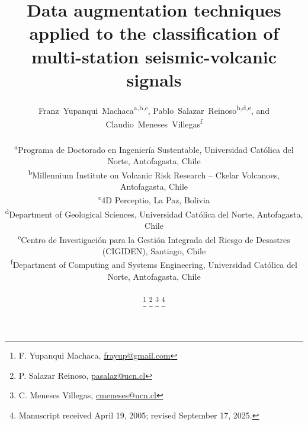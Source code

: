 \documentclass[journal]{IEEEtran}
\begin{document}
%
\title{Data augmentation techniques applied to the classification of multi-station seismic-volcanic signals}
%
%
%

\author{Franz~Yupanqui~Machaca\textsuperscript{a,b,c}, Pablo~Salazar~Reinoso\textsuperscript{b,d,e}, and
  Claudio~Meneses~Villegas\textsuperscript{f}\\
  \vspace{1mm}
  \begin{flushleft}
  \small\textsuperscript{a}Programa de Doctorado en Ingeniería Sustentable, Universidad Católica del Norte, Antofagasta, Chile\\
  \textsuperscript{b}Millennium Institute on Volcanic Risk Research – Ckelar Volcanoes, Antofagasta, Chile\\
  \textsuperscript{c}4D Perceptio, La Paz, Bolivia\\
  \textsuperscript{d}Department of Geological Sciences, Universidad Católica del Norte, Antofagasta, Chile\\
  \textsuperscript{e}Centro de Investigación para la Gestión Integrada del Riesgo de Desastres (CIGIDEN), Santiago, Chile\\
  \textsuperscript{f}Department of Computing and Systems Engineering, Universidad Católica del Norte, Antofagasta, Chile\\
  \end{flushleft}
  \thanks{F. Yupanqui Machaca, \color{blue}\href{mailto:frayup@gmail.com}{frayup@gmail.com} }
  \thanks{P. Salazar Reinoso, \color{blue}\href{mailto:pasalaz@ucn.cl}{pasalaz@ucn.cl} }
  \thanks{C. Meneses Villegas, \color{blue}\href{mailto:cmeneses@ucn.cl}{cmeneses@ucn.cl} }
  \thanks{Manuscript received April 19, 2005; revised September 17, 2025.}
}
\end{document}
